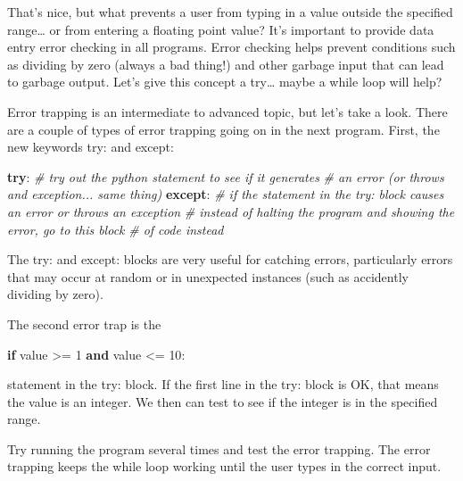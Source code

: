\documentclass[11pt]{article}
\newenvironment{Shaded}{}{}
\newcommand{\KeywordTok}[1]{\textcolor[rgb]{0.00,0.44,0.13}{\textbf{{#1}}}}
\newcommand{\DecValTok}[1]{\textcolor[rgb]{0.25,0.63,0.44}{{#1}}}
\newcommand{\CommentTok}[1]{\textcolor[rgb]{0.38,0.63,0.69}{\textit{{#1}}}}
\newcommand{\NormalTok}[1]{{#1}}
\newcommand{\ControlFlowTok}[1]{\textcolor[rgb]{0.00,0.44,0.13}{\textbf{{#1}}}}
\newcommand{\OperatorTok}[1]{\textcolor[rgb]{0.40,0.40,0.40}{{#1}}}
\begin{document}
    That's nice, but what prevents a user from typing in a value outside the
specified range\ldots{} or from entering a floating point value? It's
important to provide data entry error checking in all programs. Error
checking helps prevent conditions such as dividing by zero (always a bad
thing!) and other garbage input that can lead to garbage output. Let's
give this concept a try\ldots{} maybe a while loop will help?

Error trapping is an intermediate to advanced topic, but let's take a
look. There are a couple of types of error trapping going on in the next
program. First, the new keywords try: and except:

\begin{Shaded}
\begin{Highlighting}[]

    \ControlFlowTok{try}\NormalTok{:}
        \CommentTok{# try out the python statement to see if it generates}
        \CommentTok{# an error (or throws and exception... same thing)}
    \ControlFlowTok{except}\NormalTok{:}
        \CommentTok{# if the statement in the try: block causes an error or throws an exception}
        \CommentTok{# instead of halting the program and showing the error, go to this block}
        \CommentTok{# of code instead}
\end{Highlighting}
\end{Shaded}

The try: and except: blocks are very useful for catching errors,
particularly errors that may occur at random or in unexpected instances
(such as accidently dividing by zero).

The second error trap is the

\begin{Shaded}
\begin{Highlighting}[]
\ControlFlowTok{if}\NormalTok{ value }\OperatorTok{>=} \DecValTok{1} \KeywordTok{and}\NormalTok{ value }\OperatorTok{<=} \DecValTok{10}\NormalTok{:}
\end{Highlighting}
\end{Shaded}

statement in the try: block. If the first line in the try: block is OK,
that means the value is an integer. We then can test to see if the
integer is in the specified range.

Try running the program several times and test the error trapping. The
error trapping keeps the while loop working until the user types in the
correct input.
\end{document}
